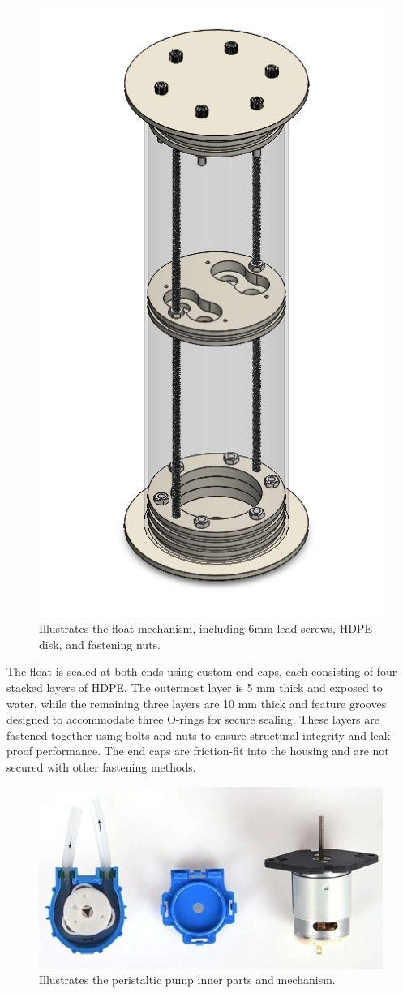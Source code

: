 \documentclass[11pt, twocolumn]{article}
\begin{document}
\begin{figure}
  \centering
  \includegraphics[width=0.39\columnwidth]{Images/Float.png}
  \caption{Illustrates the float mechanism, including 6mm lead screws, HDPE disk, and fastening nuts.}
  \label{fig:float}
\end{figure}

The float is sealed at both ends using custom end caps, each consisting of four stacked layers of HDPE. The outermost layer is 5 mm thick and exposed to water, while the remaining three layers are 10 mm thick and feature grooves designed to accommodate three O-rings for secure sealing. These layers are fastened together using bolts and nuts to ensure structural integrity and leak-proof performance. The end caps are friction-fit into the housing and are not secured with other fastening methods.

\begin{figure}[h]
  \centering
  \includegraphics[width=\columnwidth]{Images/peristaltic pump.jpg}
  \caption{Illustrates the peristaltic pump inner parts and mechanism.}
  \label{fig:pump}
\end{figure}
\end{document}
